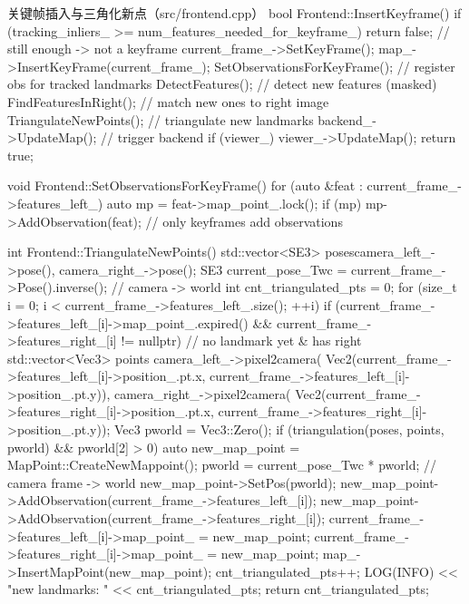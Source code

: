 \begin{codebox}[C++]{关键帧插入与三角化新点（src/frontend.cpp）}
bool Frontend::InsertKeyframe() {
    if (tracking_inliers_ >= num_features_needed_for_keyframe_)
        return false;                              // still enough -> not a keyframe
    current_frame_->SetKeyFrame();
    map_->InsertKeyFrame(current_frame_);
    SetObservationsForKeyFrame();                  // register obs for tracked landmarks
    DetectFeatures();                              // detect new features (masked)
    FindFeaturesInRight();                         // match new ones to right image
    TriangulateNewPoints();                        // triangulate new landmarks
    backend_->UpdateMap();                         // trigger backend
    if (viewer_) viewer_->UpdateMap();
    return true;
}

void Frontend::SetObservationsForKeyFrame() {
    for (auto &feat : current_frame_->features_left_) {
        auto mp = feat->map_point_.lock();
        if (mp) mp->AddObservation(feat);          // only keyframes add observations
    }
}

int Frontend::TriangulateNewPoints() {
    std::vector<SE3> poses{camera_left_->pose(), camera_right_->pose()};
    SE3 current_pose_Twc = current_frame_->Pose().inverse();   // camera -> world
    int cnt_triangulated_pts = 0;
    for (size_t i = 0; i < current_frame_->features_left_.size(); ++i) {
        if (current_frame_->features_left_[i]->map_point_.expired() &&
            current_frame_->features_right_[i] != nullptr) {   // no landmark yet & has right
            std::vector<Vec3> points{
                camera_left_->pixel2camera(
                    Vec2(current_frame_->features_left_[i]->position_.pt.x,
                         current_frame_->features_left_[i]->position_.pt.y)),
                camera_right_->pixel2camera(
                    Vec2(current_frame_->features_right_[i]->position_.pt.x,
                         current_frame_->features_right_[i]->position_.pt.y))};
            Vec3 pworld = Vec3::Zero();
            if (triangulation(poses, points, pworld) && pworld[2] > 0) {
                auto new_map_point = MapPoint::CreateNewMappoint();
                pworld = current_pose_Twc * pworld;            // camera frame -> world
                new_map_point->SetPos(pworld);
                new_map_point->AddObservation(current_frame_->features_left_[i]);
                new_map_point->AddObservation(current_frame_->features_right_[i]);
                current_frame_->features_left_[i]->map_point_  = new_map_point;
                current_frame_->features_right_[i]->map_point_ = new_map_point;
                map_->InsertMapPoint(new_map_point);
                cnt_triangulated_pts++;
            }
        }
    }
    LOG(INFO) << "new landmarks: " << cnt_triangulated_pts;
    return cnt_triangulated_pts;
}
\end{codebox}


